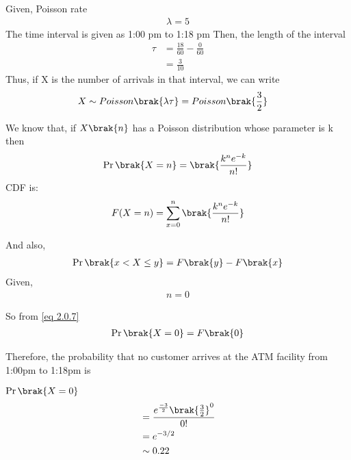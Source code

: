  Given, Poisson rate 
 \begin{align}
     \lambda = 5 \label{eq 2.0.1}
 \end{align}
 The time  interval is given as 1:00 pm to 1:18 pm
 Then, the length of the interval 
 \begin{align}
    \tau &= \frac{18}{60} - \frac{0}{60}\\
     &= \frac{3}{10}\label{eq 2.0.3}
 \end{align}
 Thus, if X is the number of arrivals in that interval, we can write
 \begin{align}
     X \sim Poisson\brak{\lambda\tau}
     &= Poisson\brak{\frac{3}{2}} 
 \end{align}
 
 We know that, if $X\brak{n}$ has a Poisson distribution whose parameter is k then
 \begin{align} \label{eq_0}
	\Pr\brak{X=n}=\brak{\frac{k^n e^{-k}}{n!}}
\end{align}
CDF is:
\begin{align}
    F(X=n)=\sum_{x=0}^{n}\brak{\frac{k^n e^{-k}}{n!}}
\end{align}
 
 And also,
\begin{align}
    \Pr\brak{x < X \le y} = F\brak{y} - F\brak{x}\label{eq 2.0.7}
\end{align}
 Given,
 \begin{align}
     n = 0 \label{eq 2.0.6}
 \end{align}
 
So from \eqref{eq 2.0.7}
\begin{align}
    \Pr\brak{X = 0} = F\brak{0}
\end{align}
 
 Therefore, the probability that no customer arrives at the ATM facility from 1:00pm to 1:18pm is 
 
  $\Pr\brak{X = 0}$
 \begin{align}
     &= \frac{e^{\frac{-3}{2}}\brak{\frac{3}{2}}^0}{0!}\\
     &= e^{-3/2}\\
     &\sim 0.22
 \end{align}